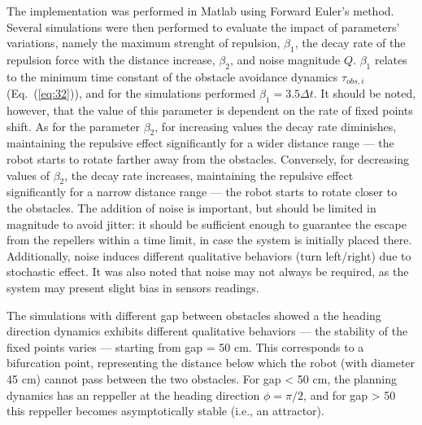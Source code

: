 The implementation was performed in Matlab using Forward
Euler's method. Several simulations were then performed to evaluate the impact
of parameters' variations, namely the maximum strenght of repulsion,
$\beta_1$, the decay rate of the repulsion force with the distance increase,
$\beta_2$, and noise magnitude $Q$. $\beta_1$ relates to the minimum time
constant of the obstacle avoidance dynamics $\tau_{obs,i}$ (Eq.~(\ref{eq:32})),
and for the simulations performed $\beta_1 = 3.5 \Delta t$. It should be noted,
however, that the value of this parameter is dependent on the rate of fixed
points shift. As for the parameter $\beta_2$, for increasing values the decay
rate diminishes, maintaining the repulsive effect significantly for
a wider distance range --- the robot starts to rotate farther away from the
obstacles. Conversely, for decreasing values of $\beta_2$, the decay rate
increases, maintaining the repulsive effect significantly for
a narrow distance range --- the robot starts to rotate closer to the
obstacles. The addition of noise is important, but should be limited in
magnitude to avoid jitter: it should be sufficient enough to guarantee the escape from the
repellers within a time limit, in case the system is initially placed
there. Additionally, noise induces different qualitative behaviors (turn
left/right) due to stochastic effect. It was also noted that noise may not
always be required, as the system may present slight bias in sensors
readings. 

The simulations with different gap between obstacles showed a
the heading direction dynamics
exhibits different qualitative behaviors --- the stability of the fixed
points varies --- starting from gap = 50 cm. This corresponds to a bifurcation
point, representing the distance below which the robot
(with diameter 45 cm) cannot pass between the two obstacles. For gap < 50 cm, the planning dynamics has an reppeller
at the heading direction $\phi = \pi/2$, and for gap > 50 this reppeller becomes
asymptotically stable (i.e., an attractor). 

